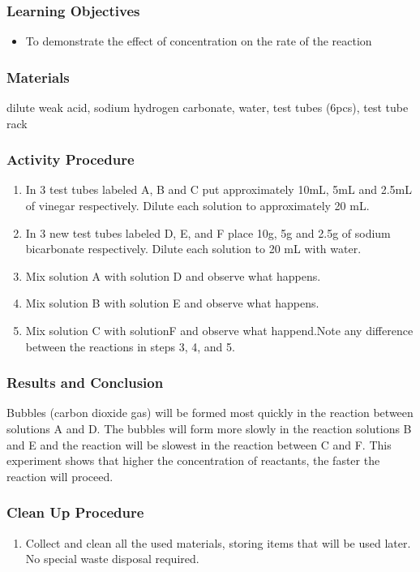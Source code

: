 \subsubsection*{Learning Objectives}
\begin{itemize}
\item{To demonstrate the effect of concentration on the rate of the reaction}
\end{itemize}

\subsubsection*{Materials}
dilute weak acid, sodium hydrogen carbonate, water, test tubes (6pcs), test tube rack

\subsubsection*{Activity Procedure}
\begin{enumerate}
\item{In 3 test tubes labeled A, B and C put approximately 10mL, 5mL and 2.5mL of vinegar respectively. Dilute each solution to approximately 20 mL.}
\item{In 3 new test tubes labeled  D, E, and F place 10g, 5g and 2.5g of sodium bicarbonate respectively. Dilute each solution to 20 mL with water.}
\item{Mix solution A with solution D and observe what happens.}
\item{Mix solution B with solution E and observe what happens.}
\item{Mix solution C with solutionF and observe what happend.Note any difference between the reactions in steps 3, 4, and 5.}
\end{enumerate}

\subsubsection*{Results and Conclusion}
Bubbles (carbon dioxide gas) will be formed most quickly in the reaction between solutions A and D. The bubbles will form more slowly in the reaction solutions B and E and the reaction will be slowest in the reaction between C and F. 
This experiment shows that higher the concentration of reactants, the faster the reaction will proceed.

\subsubsection*{Clean Up Procedure}
\begin{enumerate}
\item{Collect and clean all the used materials, storing items that will be used later. No special waste disposal required.}
\end{enumerate}


